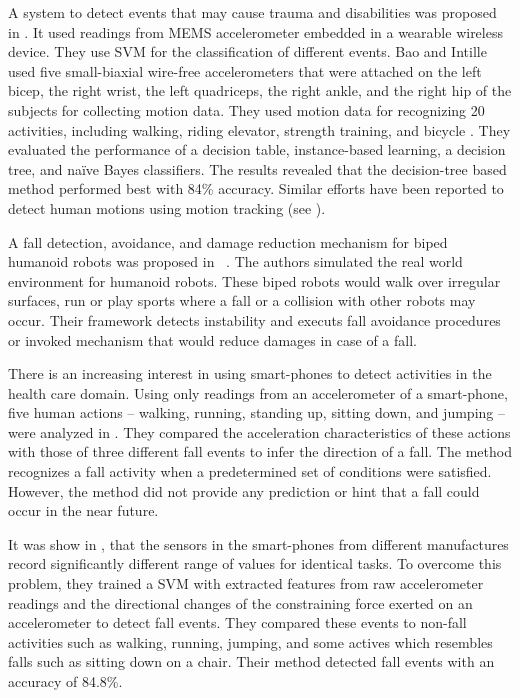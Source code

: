\documentclass[]{IEEEtran}
\begin{document}
A system  to detect  events that may cause trauma and disabilities  was
proposed in \cite{leoneFallDetection2013}. It used readings from MEMS
accelerometer embedded in a wearable wireless device. They use SVM for
the classification of different events. Bao and Intille 
\cite{BaoActivityrecognition2004} used five small-biaxial wire-free accelerometers
that were attached  on the left bicep, the right wrist, the left quadriceps, the
right ankle, and the right hip  of the subjects for collecting motion data. They used motion data for 
recognizing 20 activities, including walking, riding elevator, strength training, and
bicycle . They evaluated the performance of a decision table,
instance-based learning, a decision tree, and na\"{i}ve Bayes classifiers. The results
revealed that the decision-tree based method performed best with 84\%
accuracy.  Similar efforts have been reported to detect human motions using
motion tracking (see
\cite{dumitracheFallDetection2013,kumarActivitAndFallDetection2013,krishnanActivityRecognition2014,gaoActivityRecognition2014,alvarezActivityAndFallRecognotion2015}).
 

A fall detection, avoidance, and damage reduction mechanism for biped humanoid
robots was proposed in {~\cite{moyaFallAndDamageDetection2015}}.  The authors
simulated the real world environment for humanoid robots. These biped robots would
walk over irregular surfaces, run or play sports where a fall or a collision with
other robots may occur. Their framework detects instability and executs fall
avoidance  procedures or invoked mechanism that would reduce damages in case
of a fall. %

There is an increasing interest in using smart-phones to detect activities in the
health care domain. Using only readings from an accelerometer of a
smart-phone,  five human actions -- walking, running, standing up, sitting
down, and jumping  -- were analyzed in \cite{baiFallDetectionPhone2013}. They
compared the acceleration characteristics of these actions with  those of three
different fall events to infer the direction of a fall. The method recognizes a
fall activity when a predetermined set of conditions were satisfied. However,
the method did not provide any prediction or hint that a fall could occur in
the near future. 

It was show in \cite{steidlFallDetection2012}, that the sensors in the
smart-phones from different manufactures record significantly different range of
values for identical tasks.  To overcome this problem, they trained a SVM with
extracted features from raw accelerometer readings and the directional changes
of the constraining force exerted on an accelerometer to detect fall events.
They compared these events to non-fall activities such as walking, running,
jumping, and some actives which resembles falls such as sitting down on a
chair. Their method detected fall events with an accuracy of 84.8\%. 
\end{document}
